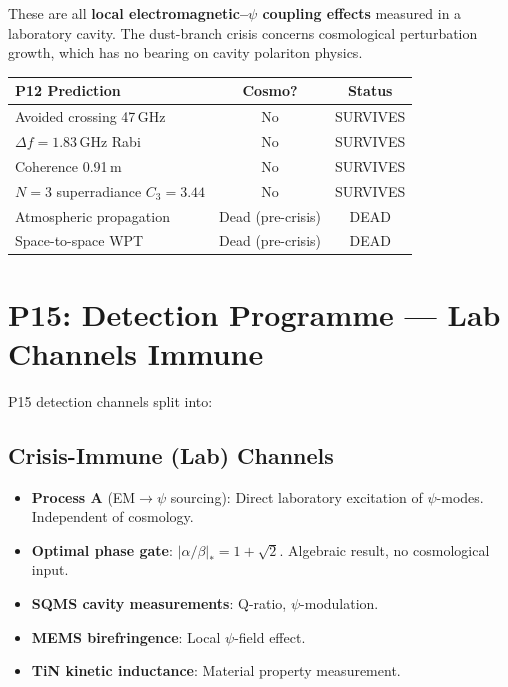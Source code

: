 \documentclass[11pt]{article}
\begin{document}
These are all \textbf{local electromagnetic--$\psi$ coupling effects}
measured in a laboratory cavity. The dust-branch crisis concerns
cosmological perturbation growth, which has no bearing on cavity
polariton physics.

\begin{table}[h]
\centering
\begin{tabular}{lcc}
\toprule
\textbf{P12 Prediction} & \textbf{Cosmo?} & \textbf{Status} \\
\midrule
Avoided crossing 47\,GHz & No & SURVIVES \\
$\Delta f = 1.83$\,GHz Rabi & No & SURVIVES \\
Coherence 0.91\,m & No & SURVIVES \\
$N=3$ superradiance $C_3 = 3.44$ & No & SURVIVES \\
Atmospheric propagation & Dead (pre-crisis) & DEAD \\
Space-to-space WPT & Dead (pre-crisis) & DEAD \\
\bottomrule
\end{tabular}
\end{table}

\section{P15: Detection Programme --- Lab Channels Immune}

P15 detection channels split into:

\subsection{Crisis-Immune (Lab) Channels}
\begin{itemize}
\item \textbf{Process A} (EM$\to\psi$ sourcing): Direct laboratory
  excitation of $\psi$-modes. Independent of cosmology.
\item \textbf{Optimal phase gate}: $|\alpha/\beta|_* = 1 + \sqrt{2}$.
  Algebraic result, no cosmological input.
\item \textbf{SQMS cavity measurements}: Q-ratio, $\psi$-modulation.
\item \textbf{MEMS birefringence}: Local $\psi$-field effect.
\item \textbf{TiN kinetic inductance}: Material property measurement.
\end{itemize}
\end{document}
